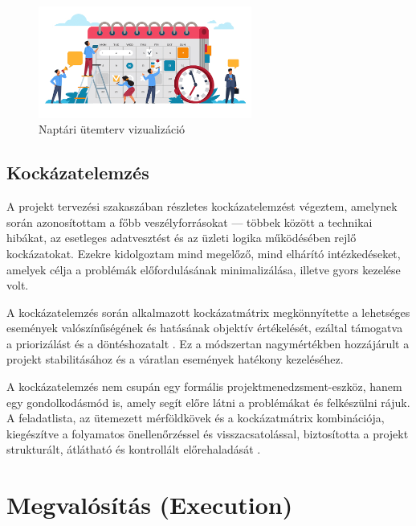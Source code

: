 \begin{figure}[H]
    \centering
    \includegraphics[width=70mm, keepaspectratio]{figures/plan.png}
    \caption{Naptári ütemterv vizualizáció}
    \label{fig:plan}
\end{figure}

\subsection{Kockázatelemzés}

A projekt tervezési szakaszában részletes kockázatelemzést végeztem, amelynek során azonosítottam a főbb veszélyforrásokat — többek között a technikai hibákat, 
az esetleges adatvesztést és az üzleti logika működésében rejlő kockázatokat.  
Ezekre kidolgoztam mind megelőző, mind elhárító intézkedéseket, amelyek célja a problémák előfordulásának minimalizálása, illetve gyors kezelése volt.  

A kockázatelemzés során alkalmazott kockázatmátrix megkönnyítette a lehetséges események valószínűségének és hatásának objektív értékelését, 
ezáltal támogatva a priorizálást és a döntéshozatalt \cite{Kovacs2016,Kaposi2019}.  
Ez a módszertan nagymértékben hozzájárult a projekt stabilitásához és a váratlan események hatékony kezeléséhez.  

A kockázatelemzés nem csupán egy formális projektmenedzsment-eszköz, hanem egy gondolkodásmód is, 
amely segít előre látni a problémákat és felkészülni rájuk.  
A feladatlista, az ütemezett mérföldkövek és a kockázatmátrix kombinációja, kiegészítve a folyamatos önellenőrzéssel és 
visszacsatolással, biztosította a projekt strukturált, átlátható és kontrollált előrehaladását \cite{Hajdu2014,Szalay2018}.

\section{Megvalósítás (Execution)}

